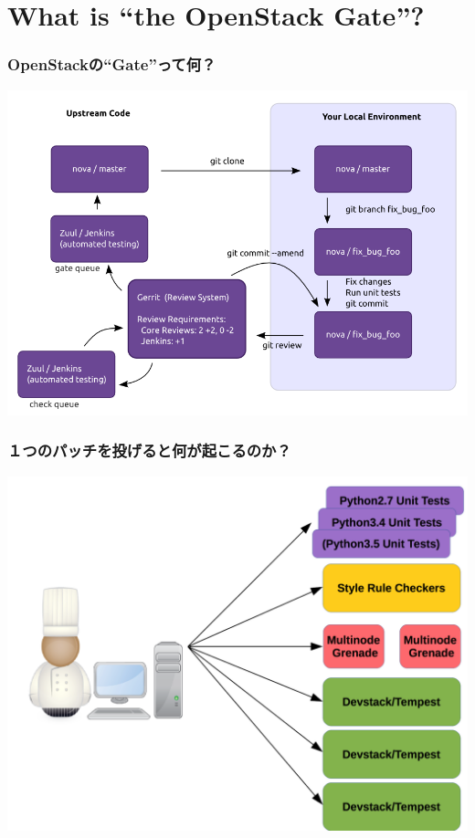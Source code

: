 \documentclass[aspectratio=169,11pt,hyperref={colorlinks=true}]{beamer}
\begin{document}
\section{What is ``the OpenStack Gate''?}
\begin{frame}
  \frametitle{OpenStackの``Gate''って何？}
  \begin{center}
    \includegraphics[width=.65\textwidth]{code_review.png}
  \end{center}
\end{frame}

\begin{frame}
  \frametitle{１つのパッチを投げると何が起こるのか？}
  \begin{center}
    \includegraphics[width=.7\textwidth]{jobs.png}
  \end{center}
\end{frame}
\end{document}
